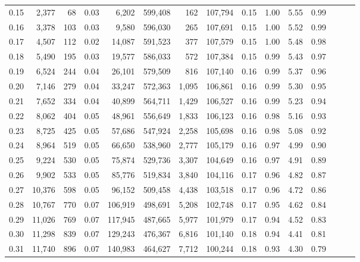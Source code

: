 \begin{tabular}{rrrrrrrrrrrrrrr}
0.15 &   2,377 &     68 &  0.03 &    6,202 &  599,408 &      162 &  107,794 &  0.15 &  1.00 &  5.55 &      0.99 \\
0.16 &   3,378 &    103 &  0.03 &    9,580 &  596,030 &      265 &  107,691 &  0.15 &  1.00 &  5.52 &      0.99 \\
0.17 &   4,507 &    112 &  0.02 &   14,087 &  591,523 &      377 &  107,579 &  0.15 &  1.00 &  5.48 &      0.98 \\
0.18 &   5,490 &    195 &  0.03 &   19,577 &  586,033 &      572 &  107,384 &  0.15 &  0.99 &  5.43 &      0.97 \\
0.19 &   6,524 &    244 &  0.04 &   26,101 &  579,509 &      816 &  107,140 &  0.16 &  0.99 &  5.37 &      0.96 \\
0.20 &   7,146 &    279 &  0.04 &   33,247 &  572,363 &    1,095 &  106,861 &  0.16 &  0.99 &  5.30 &      0.95 \\
0.21 &   7,652 &    334 &  0.04 &   40,899 &  564,711 &    1,429 &  106,527 &  0.16 &  0.99 &  5.23 &      0.94 \\
0.22 &   8,062 &    404 &  0.05 &   48,961 &  556,649 &    1,833 &  106,123 &  0.16 &  0.98 &  5.16 &      0.93 \\
0.23 &   8,725 &    425 &  0.05 &   57,686 &  547,924 &    2,258 &  105,698 &  0.16 &  0.98 &  5.08 &      0.92 \\
0.24 &   8,964 &    519 &  0.05 &   66,650 &  538,960 &    2,777 &  105,179 &  0.16 &  0.97 &  4.99 &      0.90 \\
0.25 &   9,224 &    530 &  0.05 &   75,874 &  529,736 &    3,307 &  104,649 &  0.16 &  0.97 &  4.91 &      0.89 \\
0.26 &   9,902 &    533 &  0.05 &   85,776 &  519,834 &    3,840 &  104,116 &  0.17 &  0.96 &  4.82 &      0.87 \\
0.27 &  10,376 &    598 &  0.05 &   96,152 &  509,458 &    4,438 &  103,518 &  0.17 &  0.96 &  4.72 &      0.86 \\
0.28 &  10,767 &    770 &  0.07 &  106,919 &  498,691 &    5,208 &  102,748 &  0.17 &  0.95 &  4.62 &      0.84 \\
0.29 &  11,026 &    769 &  0.07 &  117,945 &  487,665 &    5,977 &  101,979 &  0.17 &  0.94 &  4.52 &      0.83 \\
0.30 &  11,298 &    839 &  0.07 &  129,243 &  476,367 &    6,816 &  101,140 &  0.18 &  0.94 &  4.41 &      0.81 \\
0.31 &  11,740 &    896 &  0.07 &  140,983 &  464,627 &    7,712 &  100,244 &  0.18 &  0.93 &  4.30 &      0.79 \\

\end{tabular}

